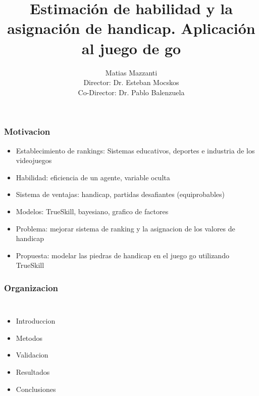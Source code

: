 \documentclass{beamer}
\title[Estimación de habilidad y la asignación de handicap]{Estimación de habilidad y la asignación de handicap. Aplicación al juego de go}
\author[Matias Mazzanti]{Matias Mazzanti\\ \footnotesize Director: Dr. Esteban Mocskos\\ \footnotesize Co-Director: Dr. Pablo Balenzuela}
\institute{Universidad de Buenos Aires}
\begin{document}
\begin{frame}

\maketitle

\end{frame}



\begin{frame}
\frametitle{Motivacion}

\begin{itemize}
 \item Establecimiento de rankings: Sistemas educativos, deportes e industria de los videojuegos
 \item Habilidad: eficiencia de un agente, variable oculta
 \item Sistema de ventajas: handicap, partidas desafiantes (equiprobables)
 \item Modelos: TrueSkill, bayesiano, grafico de factores
 \item Problema: mejorar sistema de ranking y la asignacion de los valores de handicap
 \item Propuesta: modelar las piedras de handicap en el juego go utilizando TrueSkill
\end{itemize}



\end{frame}

\begin{frame}
\frametitle{Organizacion}
\begin{columns}

\begin{itemize}
\setlength\itemsep{0.5cm}
 \item Introduccion
 \item Metodos
 \item Validacion
 \item Resultados
 \item Conclusiones 
\end{itemize}
\end{columns}
\end{frame}
\end{document}
